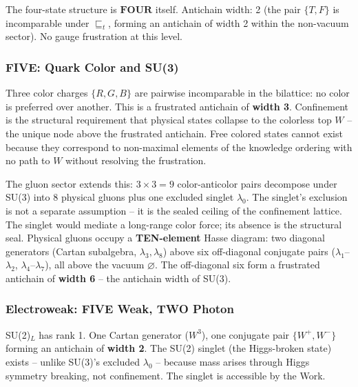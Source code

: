 The four-state structure is \(\mathbf{FOUR}\) itself. Antichain width: 2
(the pair \(\{T, F\}\) is incomparable under \(\sqsubseteq_t\), forming
an antichain of width 2 within the non-vacuum sector). No gauge
frustration at this level.

\hypertarget{five-quark-color-and-su3}{%
\subsubsection{FIVE: Quark Color and
SU(3)}\label{five-quark-color-and-su3}}

Three color charges \(\{R, G, B\}\) are pairwise incomparable in the
bilattice: no color is preferred over another. This is a frustrated
antichain of \textbf{width 3}. Confinement is the structural requirement
that physical states collapse to the colorless top \(W\) -- the unique
node above the frustrated antichain. Free colored states cannot exist
because they correspond to non-maximal elements of the knowledge
ordering with no path to \(W\) without resolving the frustration.

The gluon sector extends this: \(3 \times 3 = 9\) color-anticolor pairs
decompose under SU(3) into 8 physical gluons plus one excluded singlet
\(\lambda_0\). The singlet's exclusion is not a separate assumption --
it is the sealed ceiling of the confinement lattice. The singlet would
mediate a long-range color force; its absence is the structural seal.
Physical gluons occupy a \textbf{TEN-element} Hasse diagram: two
diagonal generators (Cartan subalgebra, \(\lambda_3, \lambda_8\)) above
six off-diagonal conjugate pairs (\(\lambda_1\)--\(\lambda_2\),
\(\lambda_4\)--\(\lambda_7\)), all above the vacuum \(\varnothing\). The
off-diagonal six form a frustrated antichain of \textbf{width 6} -- the
antichain width of SU(3).

\hypertarget{electroweak-five-weak-two-photon}{%
\subsubsection{Electroweak: FIVE Weak, TWO
Photon}\label{electroweak-five-weak-two-photon}}

SU(2)\(_L\) has rank 1. One Cartan generator (\(W^3\)), one conjugate
pair \(\{W^+, W^-\}\) forming an antichain of \textbf{width 2}. The
SU(2) singlet (the Higgs-broken state) exists -- unlike SU(3)'s excluded
\(\lambda_0\) -- because mass arises through Higgs symmetry breaking,
not confinement. The singlet is accessible by the Work.

